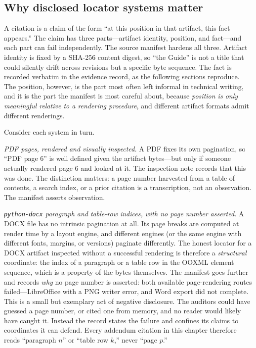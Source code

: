 \subsection{Why disclosed locator systems matter}\label{ch04:locators}

A citation is a claim of the form ``at this position in that artifact, this
fact appears.'' The claim has three parts---artifact identity, position, and
fact---and each part can fail independently. The source manifest hardens all
three. Artifact identity is fixed by a SHA-256 content digest, so ``the
Guide'' is not a title that could silently drift across revisions but a
specific byte sequence. The fact is recorded verbatim in the evidence record,
as the following sections reproduce. The position, however, is the part most
often left informal in technical writing, and it is the part the manifest is
most careful about, because \emph{position is only meaningful relative to a
rendering procedure}, and different artifact formats admit different
renderings.

Consider each system in turn.

\emph{PDF pages, rendered and visually inspected.} A PDF fixes its own
pagination, so ``PDF page 6'' is well defined given the artifact bytes---but
only if someone actually rendered page 6 and looked at it. The inspection
note records that this was done. The distinction matters: a page number
harvested from a table of contents, a search index, or a prior citation is a
transcription, not an observation. The manifest asserts observation.

\emph{\texttt{python-docx} paragraph and table-row indices, with no page
number asserted.} A DOCX file has no intrinsic pagination at all. Its page
breaks are computed at render time by a layout engine, and different engines
(or the same engine with different fonts, margins, or versions) paginate
differently. The honest locator for a DOCX artifact inspected without a
successful rendering is therefore a \emph{structural} coordinate: the index
of a paragraph or a table row in the OOXML element sequence, which is a
property of the bytes themselves. The manifest goes further and records
\emph{why} no page number is asserted: both available page-rendering routes
failed---LibreOffice with a PNG writer error, and Word export did not
complete. This is a small but exemplary act of negative disclosure. The
auditors could have guessed a page number, or cited one from memory, and no
reader would likely have caught it. Instead the record states the failure and
confines its claims to coordinates it can defend. Every addendum citation in
this chapter therefore reads ``paragraph $n$'' or ``table row $k$,'' never
``page $p$.''


